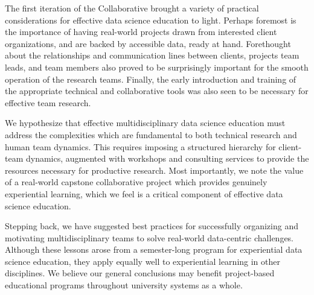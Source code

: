 \documentclass[12pt]{article}
\begin{document}
The first iteration of the Collaborative brought a variety of practical considerations for effective data science education to light.  Perhaps foremost is the importance of having real-world projects drawn from interested client organizations, and are backed by accessible data, ready at hand.  Forethought about the relationships and communication lines between clients, projects team leads, and team members also proved to be surprisingly important for the smooth operation of the research teams.  Finally, the early introduction and training of the appropriate technical and collaborative tools was also seen to be necessary for effective team research.

We hypothesize that effective multidisciplinary data science education must address the complexities which are fundamental to both technical research and human team dynamics. This requires imposing a structured hierarchy for client-team dynamics, augmented with workshops and consulting services to provide the resources necessary for productive research.  Most importantly, we note the value of a real-world capstone collaborative project which provides genuinely experiential learning, which we feel is a critical component of effective data science education.

Stepping back, we have suggested best practices for successfully organizing and motivating multidisciplinary teams to solve real-world data-centric challenges.  Although these lessons arose from a semester-long program for experiential data science education, they apply equally well to experiential learning in other disciplines.  We believe our general conclusions may benefit project-based educational programs throughout university systems as a whole.



\newpage

%
%

\newpage
\printbibliography
\end{document}
